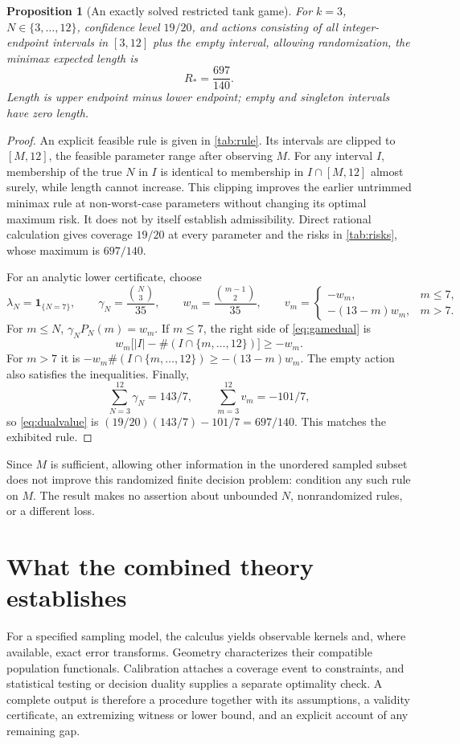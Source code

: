 \documentclass[11pt]{article}
\numberwithin{equation}{section}
\newtheorem{proposition}[proposition]{Proposition}
\theoremstyle{definition}
\theoremstyle{remark}
\newcommand{\ind}{\mathbf1}
\begin{document}
\begin{proposition}[An exactly solved restricted tank game]\label{prop:finitegame}
For $k=3$, $N\in\{3,\ldots,12\}$, confidence level $19/20$, and actions consisting of all integer-endpoint intervals in $[3,12]$ plus the empty interval, allowing randomization, the minimax expected length is
\begin{equation}\label{eq:697}
 R_*=\frac{697}{140}.
\end{equation}
Length is upper endpoint minus lower endpoint; empty and singleton intervals have zero length.
\end{proposition}
\begin{proof}
An explicit feasible rule is given in \cref{tab:rule}. Its intervals are clipped to $[M,12]$, the feasible parameter range after observing $M$. For any interval $I$, membership of the true $N$ in $I$ is identical to membership in $I\cap[M,12]$ almost surely, while length cannot increase. This clipping improves the earlier untrimmed minimax rule at non-worst-case parameters without changing its optimal maximum risk. It does not by itself establish admissibility. Direct rational calculation gives coverage $19/20$ at every parameter and the risks in \cref{tab:risks}, whose maximum is $697/140$.

For an analytic lower certificate, choose
\[
 \lambda_N=\ind_{\{N=7\}},\qquad
 \gamma_N=\frac{\binom N3}{35},\qquad
 w_m=\frac{\binom{m-1}2}{35},\qquad
 v_m=\begin{cases}-w_m,&m\le7,\\-(13-m)w_m,&m>7.\end{cases}
\]
For $m\le N$, $\gamma_NP_N(m)=w_m$. If $m\le7$, the right side of \eqref{eq:gamedual} is
\[
 w_m\bigl[|I|-\#(I\cap\{m,\ldots,12\})\bigr]\ge-w_m.
\]
For $m>7$ it is $-w_m\#(I\cap\{m,\ldots,12\})\ge-(13-m)w_m$. The empty action also satisfies the inequalities. Finally,
\[
 \sum_{N=3}^{12}\gamma_N=143/7,\qquad
 \sum_{m=3}^{12}v_m=-101/7,
\]
so \eqref{eq:dualvalue} is $(19/20)(143/7)-101/7=697/140$. This matches the exhibited rule.
\end{proof}
Since $M$ is sufficient, allowing other information in the unordered sampled subset does not improve this randomized finite decision problem: condition any such rule on $M$. The result makes no assertion about unbounded $N$, nonrandomized rules, or a different loss.

\section{What the combined theory establishes}\label{sec:discussion}
For a specified sampling model, the calculus yields observable kernels and, where available, exact error transforms. Geometry characterizes their compatible population functionals. Calibration attaches a coverage event to constraints, and statistical testing or decision duality supplies a separate optimality check. A complete output is therefore a procedure together with its assumptions, a validity certificate, an extremizing witness or lower bound, and an explicit account of any remaining gap.
\end{document}
